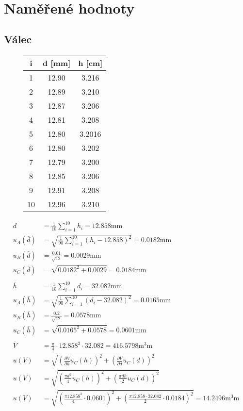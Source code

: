 \documentclass[titlepage]{article}
\begin{document}
\section{Naměřené hodnoty}
\subsection{Válec}

\begin{figure}[h]
	\centering
\begin{tabular}{c|c|c}
	i & d [\si{\milli\meter}] & h [\si{\centi\meter}] \\\hline\hline
	1 & 12.90 & 3.216\\\hline
	2 & 12.89 & 3.210\\\hline
	3 & 12.87 & 3.206\\\hline
	4 & 12.81 & 3.208\\\hline
	5 & 12.80 & 3.2016\\\hline
	6 & 12.80 & 3.202\\\hline
	7 & 12.79 & 3.200\\\hline
	8 & 12.85 & 3.206\\\hline
	9 & 12.91 & 3.208\\\hline
	10 & 12.96 & 3.210
\end{tabular}
\end{figure}

$$
\begin{aligned}
	\bar{d} &= \frac{1}{10} \sum_{i=1}^{10}h_i = 12.858 \si{\milli\meter}\\
	u_A(\bar{d}) &= \sqrt{\frac{1}{90}\sum_{i=1}^{10}(h_i-12.858)^2} = 0.0182 \si{\milli\meter}\\
	u_B(\bar{d}) &= \frac{0.01}{\sqrt{12}} = 0.0029 \si{\milli\meter}\\
	u_C(\bar{d}) &= \sqrt{0.0182^2+0.0029} = 0.0184 \si{\milli\meter}\\
	\\
	\bar{h} &= \frac{1}{10} \sum_{i=1}^{10}d_i = 32.082 \si{\milli\meter}\\
	u_A(\bar{h}) &= \sqrt{\frac{1}{90}\sum_{i=1}^{10}(d_i-32.082)^2} = 0.0165 \si{\milli\meter}\\
	u_B(\bar{h}) &= \frac{0.2}{\sqrt{12}} = 0.0578 \si{\milli\meter}\\
	u_C(\bar{h}) &= \sqrt{0.0165^2+0.0578} = 0.0601 \si{\milli\meter}\\
	\\
	\bar{V} &= \frac{\pi}{4} \cdot 12.858^2 \cdot 32.082 = 416.5798 \si{\cubic\milli\meter}\\
	u(V) &= \sqrt{(\frac{\partial V}{\partial h}u_C(h))^2 + (\frac{\partial V}{\partial d}u_C(d))^2}\\
	u(V) &= \sqrt{(\frac{\pi d^2}{4} u_C(h))^2 + (\frac{\pi d h}{2} u_C(d))^2}\\
	u(V) &= \sqrt{(\frac{\pi 12.858^2}{4} \cdot 0.0601)^2 + (\frac{\pi 12.858 \cdot 32.082}{2} \cdot 0.0184)^2} = 14.2496 \si{\cubic\milli\meter}
\end{aligned}
$$
\end{document}
